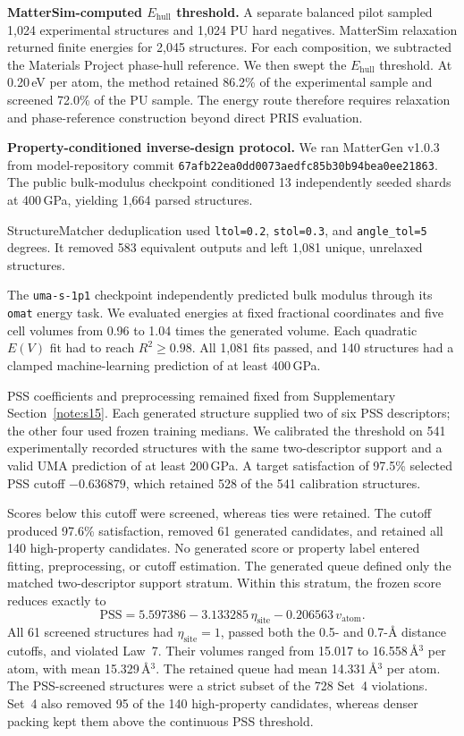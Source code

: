 \textbf{MatterSim-computed \(E_{\mathrm{hull}}\) threshold.} A separate balanced
pilot sampled 1{,}024 experimental structures and 1{,}024 PU hard negatives.
MatterSim relaxation returned finite energies for 2{,}045 structures. For each
composition, we subtracted the Materials Project phase-hull reference. We then
swept the \(E_{\mathrm{hull}}\) threshold. At 0.20\,eV per atom, the method
retained 86.2\% of the experimental sample and screened 72.0\% of the PU sample.
The energy route therefore requires relaxation and phase-reference construction
beyond direct PRIS evaluation.

\textbf{Property-conditioned inverse-design protocol.} We ran MatterGen v1.0.3
from model-repository commit
\texttt{67afb22ea0dd0073aedfc85b30b94bea0ee21863}. The public bulk-modulus
checkpoint conditioned 13 independently seeded shards at 400\,GPa, yielding
1{,}664 parsed structures.

StructureMatcher deduplication used \texttt{ltol=0.2}, \texttt{stol=0.3}, and
\texttt{angle\_tol=5} degrees. It removed 583 equivalent outputs and left 1{,}081
unique, unrelaxed structures.

The \texttt{uma-s-1p1} checkpoint independently predicted bulk modulus through
its \texttt{omat} energy task. We evaluated energies at fixed fractional
coordinates and five cell volumes from 0.96 to 1.04 times the generated volume.
Each quadratic \(E(V)\) fit had to reach \(R^2\geq0.98\). All 1{,}081 fits passed,
and 140 structures had a clamped machine-learning prediction of at least
400\,GPa.

PSS coefficients and preprocessing remained fixed from Supplementary
Section~\ref{note:s15}. Each generated structure supplied two of six PSS
descriptors; the other four used frozen training medians. We calibrated the
threshold on 541 experimentally recorded structures with the same two-descriptor
support and a valid UMA prediction of at least 200\,GPa. A target satisfaction of
97.5\% selected PSS cutoff $-0.636879$, which retained 528 of the 541 calibration
structures.

Scores below this cutoff were screened, whereas ties were retained. The cutoff
produced 97.6\% satisfaction, removed 61 generated candidates, and retained all
140 high-property candidates. No generated score or property label entered
fitting, preprocessing, or cutoff estimation. The generated queue defined only
the matched two-descriptor support stratum. Within this stratum, the frozen score
reduces exactly to
\begin{equation*}
  \mathrm{PSS}=5.597386-3.133285\,\eta_{\mathrm{site}}
  -0.206563\,v_{\mathrm{atom}}.
\end{equation*}
All 61 screened structures had \(\eta_{\mathrm{site}}=1\), passed both the 0.5-
and 0.7-\AA{} distance cutoffs, and violated Law~7. Their volumes ranged from
15.017 to 16.558\,\AA$^3$ per atom, with mean 15.329\,\AA$^3$. The retained queue
had mean 14.331\,\AA$^3$ per atom. The PSS-screened structures were a strict
subset of the 728 Set~4 violations. Set~4 also removed 95 of the 140
high-property candidates, whereas denser packing kept them above the continuous
PSS threshold.

